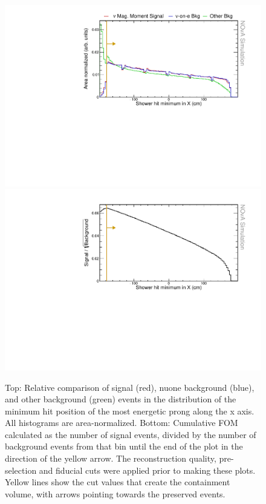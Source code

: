 \begin{figure}[hbtp]
\centering
\includegraphics[width=.9\textwidth]{Plots/NuMMEventSelection/N1Cut_minX.pdf}
\includegraphics[width=.9\textwidth]{Plots/NuMMEventSelection/NuMM_N1Cut_minXright_FOMStats.pdf}
\caption[Hit minimum x containment cut]{Top: Relative comparison of signal (red), \acrshort{nuone} background (blue), and other background (green) events in the distribution of the minimum hit position of the most energetic prong along the x axis. All histograms are area-normalized. Bottom: Cumulative \acrshort{FOM} calculated as the number of signal events, divided by the number of background events from that bin until the end of the plot in the direction of the yellow arrow. The reconstruction quality, pre-selection and fiducial cuts were applied prior to making these plots. Yellow lines show the cut values that create the containment volume, with arrows pointing towards the preserved events.}
\label{fig:NuMMContainmentCutMinX}
\end{figure}

